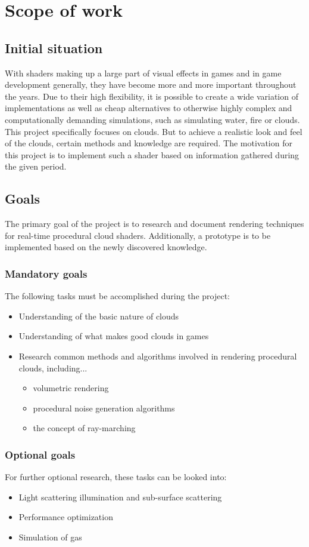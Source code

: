 \documentclass[a4paper,11pt]{article}
\begin{document}
\section{Scope of work}

\subsection{Initial situation}
With shaders making up a large part of visual effects in games and in game development generally, they have become more and more important throughout the years. Due to their high flexibility, it is possible to create a wide variation of implementations as well as cheap alternatives to otherwise highly complex and computationally demanding simulations, such as simulating water, fire or clouds.
\\
This project specifically focuses on clouds. But to achieve a realistic look and feel of the clouds, certain methods and knowledge are required. The motivation for this project is to implement such a shader based on information gathered during the given period.

\subsection{Goals}
The primary goal of the project is to research and document rendering techniques for real-time procedural cloud shaders. Additionally, a prototype is to be implemented based on the newly discovered knowledge.

\subsubsection{Mandatory goals}
The following tasks must be accomplished during the project:
\begin{itemize}
\item Understanding of the basic nature of clouds
\item Understanding of what makes good clouds in games
\item Research common methods and algorithms involved in rendering procedural clouds, including...
\begin{itemize}
    \item volumetric rendering
    \item procedural noise generation algorithms
    \item the concept of ray-marching
    \end{itemize}
\end{itemize}
\subsubsection{Optional goals}
For further optional research, these tasks can be looked into:
\begin{itemize}
    \item Light scattering illumination and sub-surface scattering
    \item Performance optimization
    \item Simulation of gas
\end{itemize}

\printglossaries

\clearpage
\end{document}
